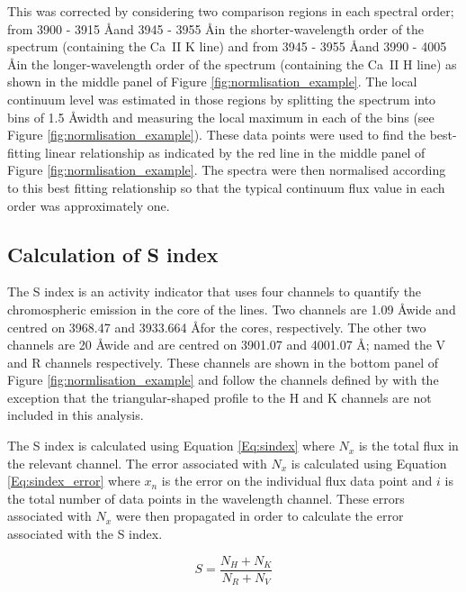 This was corrected by considering two comparison regions in each spectral order; from 3900 - 3915 \AA \space and 3945 - 3955 \AA \space in the shorter-wavelength order of the spectrum (containing the Ca~II K line) and from 3945 - 3955 \AA \space and 3990 - 4005 \AA \space in the longer-wavelength order of the spectrum (containing the Ca~II H line) as shown in the middle panel of Figure \ref{fig:normlisation_example}. The local continuum level was estimated in those regions by splitting the spectrum into bins of 1.5 \AA \space width and measuring the local maximum in each of the bins (see Figure \ref{fig:normlisation_example}). These data points were used to find the best-fitting linear relationship as indicated by the red line in the middle panel of Figure \ref{fig:normlisation_example}. The spectra were then normalised according to this best fitting relationship so that the typical continuum flux value in each order was approximately one.

\subsection{Calculation of S index}
\label{Chp4_data_analysis_calc_S}
The S index is an activity indicator that uses four channels to quantify the chromospheric emission in the core of the \caII lines. Two channels are 1.09 \AA \space wide and centred on 3968.47 and 3933.664 \AA \space for the \caII cores, respectively. The other two channels are 20 \AA \space wide and are centred on 3901.07 and 4001.07 \AA; named the V and R channels respectively. These channels are shown in the bottom panel of Figure \ref{fig:normlisation_example} and follow the channels defined by \citet{Lovis_etal_2011} with the exception that the triangular-shaped profile to the H and K channels are not included in this analysis.

The S index is calculated using Equation \ref{Eq:sindex} where $N_{x}$ is the total flux in the relevant channel. The error associated with $N_{x}$ is calculated using Equation \eqref{Eq:sindex_error} where $x_{n}$ is the error on the individual flux data point and $i$ is the total number of data points in the wavelength channel. These errors associated with $N_{x}$ were then propagated in order to calculate the error associated with the S index.

\begin{equation}
S = \frac{N_{H} + N_{K}}{N_{R} + N_{V}}
\label{Eq:sindex}
\end{equation}

